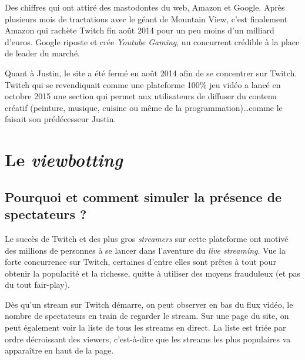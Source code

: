 \documentclass[a4paper]{article}
\begin{document}
Des chiffres qui ont attiré des mastodontes du web, Amazon et Google. Après plusieurs mois de tractations avec le géant de Mountain View, c'est finalement Amazon qui rachète Twitch fin août 2014 pour un peu moins d'un milliard d'euros. Google riposte et crée \textit{Youtube Gaming}, un concurrent crédible à la place de leader du marché.

Quant à Justin, le site a été fermé en août 2014 afin de se concentrer sur Twitch. Twitch qui se revendiquait comme une plateforme 100\% jeu vidéo a lancé en octobre 2015 une section qui permet aux utilisateurs de diffuser du contenu créatif (peinture, musique, cuisine ou même de la programmation)\ldots comme le faisait son prédécesseur Justin. 

\section{Le \textit{viewbotting}}

\subsection{Pourquoi et comment simuler la présence de spectateurs ?}

Le succès de Twitch et des plus gros \textit{streamers} sur cette plateforme ont motivé des millions de personnes à se lancer dans l'aventure du \textit{live streaming}. Vue la forte concurrence sur Twitch, certaines d'entre elles sont prêtes à tout pour obtenir la popularité et la richesse, quitte à utiliser des moyens frauduleux (et pas du tout fair-play).

Dès qu'un stream sur Twitch démarre, on peut observer en bas du flux vidéo, le nombre de spectateurs en train de regarder le stream. Sur une page du site, on peut également voir la liste de tous les streams en direct. La liste est triée par ordre décroissant des viewers, c'est-à-dire que les streams les plus populaires va apparaître en haut de la page.

\end{document}
